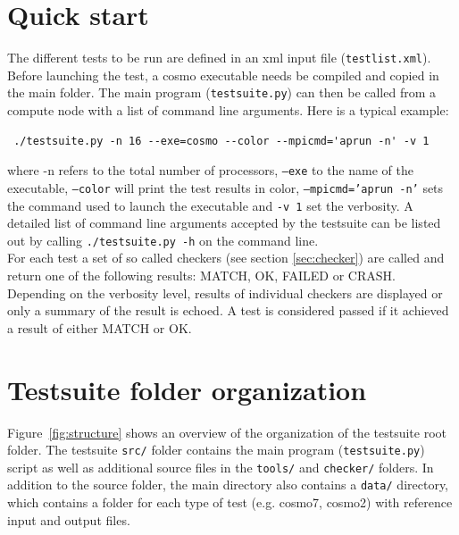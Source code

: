 \documentclass[12pt,twoside,a4paper]{report}
\begin{document}
\section{Quick start}

The different tests to be run are defined in an xml input file (\texttt{testlist.xml}). Before launching the test, a cosmo executable needs be compiled and copied in the main folder. The main program (\texttt{testsuite.py}) can then be called from a compute node with a list of command line arguments. Here is a typical example:
\begin{verbatim}
 ./testsuite.py -n 16 --exe=cosmo --color --mpicmd='aprun -n' -v 1
\end{verbatim}
where -n refers to the total number of processors, \texttt{--exe} to the name of the executable, \texttt{--color} will print the test results in color, \texttt{--mpicmd='aprun -n'} sets the command used to launch the executable and \texttt{-v 1} set the verbosity. A detailed list of command line arguments accepted by the testsuite can be listed out by calling \texttt{./testsuite.py -h} on the command line.\\
For each test a set of so called checkers (see section \ref{sec:checker}) are called and return one of the following results: MATCH, OK, FAILED or CRASH. Depending on the verbosity level, results of individual checkers are displayed or only a summary of the result is echoed. A test is considered passed if it achieved a result of either MATCH or OK.

\section{Testsuite folder organization}

Figure~\ref{fig:structure} shows an overview of the organization of the testsuite root folder. The testsuite \texttt{src/} folder contains the main program (\texttt{testsuite.py}) script as well as additional source files in the \texttt{tools/} and \texttt{checker/} folders. In addition to the source folder, the main directory also contains a \texttt{data/} directory, which contains a folder for each type of test (e.g. cosmo7, cosmo2) with reference input and output files.\\
\end{document}
